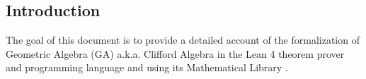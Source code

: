 \subsection*{Introduction}
\label{sec:intro}

The goal of this document is to provide a detailed account
of the formalization of Geometric Algebra (GA) a.k.a. Clifford Algebra \cite{hestenes2012clifford}
in the Lean 4 theorem prover and programming language \cite{moura2021lean, lean_2015}
and using its Mathematical Library \cite{themathlibcommunityLeanMathematicalLibrary2020}.

